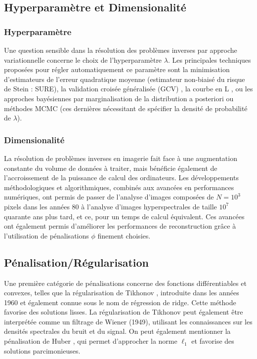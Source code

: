 \documentclass[a4paper, 12pt]{report} %
\begin{document}
\subsection{Hyperparamètre et Dimensionalité}

\subsubsection{Hyperparamètre}
Une question sensible dans la résolution des problèmes inverses par approche variationnelle concerne le choix de l’hyperparamètre \( \lambda \). Les principales techniques proposées pour régler automatiquement ce paramètre sont la minimisation d’estimateurs de l’erreur quadratique moyenne 
(estimateur non-biaisé du risque de Stein : SURE)\cite{deledalle2014stein}, la validation croisée généralisée (GCV) \cite{golub1979generalized}, la courbe en L \cite{hansen1998rank}, ou les approches bayésiennes par marginalisation de la distribution a posteriori ou méthodes MCMC (ces dernières nécessitant de spécifier la densité de probabilité de \( \lambda \)).

\subsubsection{Dimensionalité}
La résolution de problèmes inverses en imagerie fait face à une augmentation constante du volume de données à traiter, mais bénéficie également de l’accroissement de la puissance de calcul des ordinateurs. Les développements méthodologiques et algorithmiques, combinés aux avancées en performances numériques, ont permis de passer de l’analyse d’images composées de \( N = 10^3 \) pixels dans les années 80 \cite{geman1984stochastic} à l’analyse d’images hyperspectrales de taille \( 10^7 \) \cite{guilloteau2020hyperspectral} quarante ans plus tard, et ce, pour un temps de calcul équivalent. Ces avancées ont également permis d’améliorer les performances de reconstruction grâce à l’utilisation de pénalisations \( \phi \) finement choisies.

\subsection{Pénalisation/Régularisation}
Une première catégorie de pénalisations concerne des fonctions différentiables et convexes, telles que la régularisation de Tikhonov \cite{tikhonov1963solution}, introduite dans les années 1960 et également connue sous le nom de régression de ridge. Cette méthode favorise des solutions lisses. La régularisation de Tikhonov peut également être interprétée comme un filtrage de Wiener (1949), utilisant les connaissances sur les densités spectrales du bruit et du signal. On peut également mentionner la pénalisation de Huber \cite{huber1992robust}, qui permet d'approcher la norme \(\ell_1\) et favorise des solutions parcimonieuses.
\end{document}
